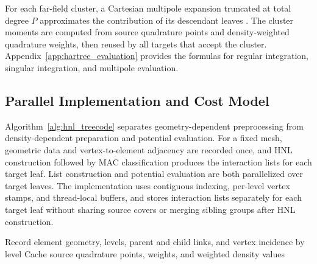 \documentclass[a4paper,pdflatex,sn-mathphys-num]{sn-jnl}
\theoremstyle{thmstyleone}
\begin{document}
For each far-field cluster, a Cartesian multipole expansion truncated at total degree $P$ approximates the contribution of its descendant leaves \cite{BeatsonGreengard1997,Cui}. The cluster moments are computed from source quadrature points and density-weighted quadrature weights, then reused by all targets that accept the cluster. Appendix~\ref{app:hartree_evaluation} provides the formulas for regular integration, singular integration, and multipole evaluation.

\subsection{Parallel Implementation and Cost Model}
\label{sec:overall_algorithm}

Algorithm~\ref{alg:hnl_treecode} separates geometry-dependent preprocessing from density-dependent preparation and potential evaluation. For a fixed mesh, geometric data and vertex-to-element adjacency are recorded once, and HNL construction followed by MAC classification produces the interaction lists for each target leaf. List construction and potential evaluation are both parallelized over target leaves. The implementation uses contiguous indexing, per-level vertex stamps, and
thread-local buffers, and stores interaction lists separately for each target
leaf without sharing source covers or merging sibling groups after HNL
construction.

\begin{algorithm}[!htbp]
\caption{Parallel HNL Treecode}
\label{alg:hnl_treecode}
Record element geometry, levels, parent and child links, and vertex incidence by level\;
Cache source quadrature points, weights, and weighted density values\;
\;
\end{algorithm}
\end{document}
